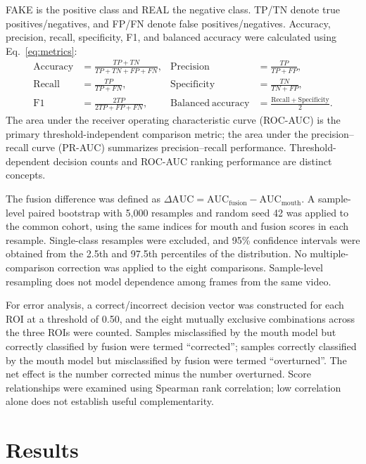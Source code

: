 \documentclass[a4paper]{elektr}
\begin{document}
FAKE is the positive class and REAL the negative class. TP/TN denote true positives/negatives, and FP/FN denote false positives/negatives. Accuracy, precision, recall, specificity, F1, and balanced accuracy were calculated using Eq.~\eqref{eq:metrics}:
\begin{equation}\label{eq:metrics}
\begin{aligned}
\mathrm{Accuracy}&=\frac{TP+TN}{TP+TN+FP+FN},&
\mathrm{Precision}&=\frac{TP}{TP+FP},\\
\mathrm{Recall}&=\frac{TP}{TP+FN},&
\mathrm{Specificity}&=\frac{TN}{TN+FP},\\
\mathrm{F1}&=\frac{2TP}{2TP+FP+FN},&
\mathrm{Balanced\ accuracy}&=\frac{\mathrm{Recall}+\mathrm{Specificity}}{2}.
\end{aligned}
\end{equation}
The area under the receiver operating characteristic curve (ROC-AUC) is the primary threshold-independent comparison metric; the area under the precision--recall curve (PR-AUC) summarizes precision--recall performance. Threshold-dependent decision counts and ROC-AUC ranking performance are distinct concepts.

The fusion difference was defined as $\Delta\mathrm{AUC}=\mathrm{AUC}_{\mathrm{fusion}}-\mathrm{AUC}_{\mathrm{mouth}}$. A sample-level paired bootstrap with 5,000 resamples and random seed 42 was applied to the common cohort, using the same indices for mouth and fusion scores in each resample. Single-class resamples were excluded, and 95\% confidence intervals were obtained from the 2.5th and 97.5th percentiles of the distribution. No multiple-comparison correction was applied to the eight comparisons. Sample-level resampling does not model dependence among frames from the same video.

For error analysis, a correct/incorrect decision vector was constructed for each ROI at a threshold of 0.50, and the eight mutually exclusive combinations across the three ROIs were counted. Samples misclassified by the mouth model but correctly classified by fusion were termed ``corrected''; samples correctly classified by the mouth model but misclassified by fusion were termed ``overturned''. The net effect is the number corrected minus the number overturned. Score relationships were examined using Spearman rank correlation; low correlation alone does not establish useful complementarity.

\section{Results}
\end{document}
